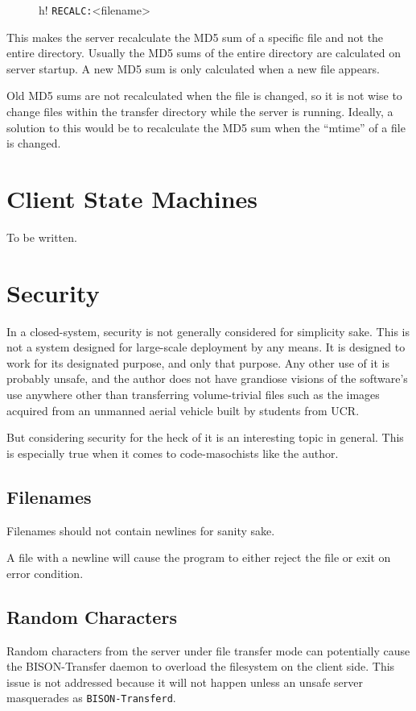 \documentclass[12pt]{article}
\begin{document}
\begin{figure}{h!}
	\centering
	\verb+RECALC:+\textvisiblespace <filename>\carriagereturn\carriagereturn
	\label{Request Recalculation}
\end{figure}

This makes the server recalculate the MD5 sum of a specific file and not the
entire directory.  Usually the MD5 sums of the entire directory are calculated
on server startup.  A new MD5 sum is only calculated when a new file appears.

Old MD5 sums are not recalculated when the file is changed, so it is not wise
to change files within the transfer directory while the server is running.
Ideally, a solution to this would be to recalculate the MD5 sum when the
``mtime'' of a file is changed.

\section{Client State Machines}
To be written.

\section{Security}
\label{sec:Security}
In a closed-system, security is not generally considered for simplicity sake.
This is not a system designed for large-scale deployment by any means.
It is designed to work for its designated purpose, and only that purpose.
Any other use of it is probably unsafe, and the author does not have grandiose
visions of the software's use anywhere other than transferring volume-trivial
files such as the images acquired from an unmanned aerial vehicle built by
students from UCR.

But considering security for the heck of it is an interesting topic in general.
This is especially true when it comes to code-masochists like the author.

\subsection{Filenames}
\label{ssec:Filenames}
Filenames should not contain newlines for sanity sake.

A file with a newline will cause the program to either reject the file or
exit on error condition.

\subsection{Random Characters}
\label{ssec:Random Characters}
Random characters from the server under file transfer mode can potentially
cause the BISON-Transfer daemon to overload the filesystem on the client side.
This issue is not addressed because it will not happen unless an unsafe server
masquerades as \verb+BISON-Transferd+.
\end{document}
